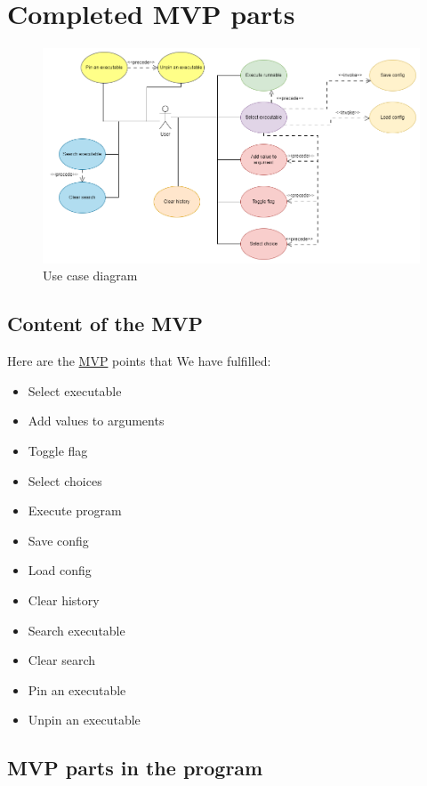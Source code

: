 \documentclass{article}
\begin{document}
\section{Completed MVP parts}

\begin{figure}[h]
    \centering
    \includegraphics[width=1\linewidth]{img/use_case_diagram.drawio.png}
    \caption{Use case diagram}
    \label{fig:enter-label}
\end{figure}

\subsection{Content of the MVP}
Here are the \href{https://github.com/CsullogBeni/szofttech/blob/main/documentation/mvp.pdf}{MVP} points that We have fulfilled:
\begin{itemize}
    \item Select executable
    \item Add values to arguments
    \item Toggle flag
    \item Select choices
    \item Execute program
    \item Save config
    \item Load config
    \item Clear history
    \item Search executable
    \item Clear search
    \item Pin an executable
    \item Unpin an executable
\end{itemize}

\subsection{MVP parts in the program}
\end{document}
